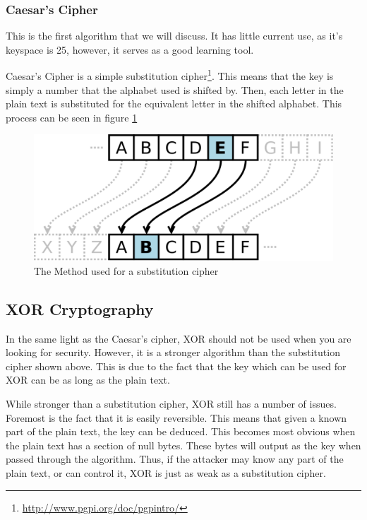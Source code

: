 \documentclass[a4paper,11pt]{report}
\begin{document}
			\subsubsection{Caesar's Cipher}
				This is the first algorithm that we will discuss. 
				It has little current use, as it's keyspace is 25, however, it serves as a good learning tool. 

				Caesar's Cipher is a simple substitution cipher\footnote{\url{http://www.pgpi.org/doc/pgpintro/}}. 
				This means that the key is simply a number that the alphabet used is shifted by. 
				Then, each letter in the plain text is substituted for the equivalent letter in the shifted alphabet. 
				This process can be seen in figure \ref{fig:CaesarsCipher}
				\begin{figure}[htb]
					\centering
					\includegraphics[scale=0.25]{./CaesarsCipher.png}
					\caption{The Method used for a substitution cipher}
					\label{fig:CaesarsCipher}
				\end{figure}
			\subsection{XOR Cryptography}
				In the same light as the Caesar's cipher, XOR should not be used when you are looking for security. 
				However, it is a stronger algorithm than the substitution cipher shown above. 
				This is due to the fact that the key which can be used for XOR can be as long as the plain text. 

				While stronger than a substitution cipher, XOR still has a number of issues. 
				Foremost is the fact that it is easily reversible. 
				This means that given a known part of the plain text, the key can be deduced. 
				This becomes most obvious when the plain text has a section of null bytes. 
				These bytes will output as the key when passed through the algorithm. 
				Thus, if the attacker may know any part of the plain text, or can control it, XOR is just as weak as a substitution cipher. 
\end{document}
